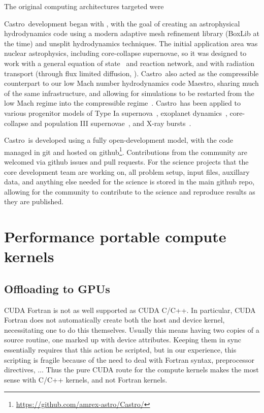 \documentclass[twocolumn,times]{aastex62}
\newcommand{\castro}{{\sf Castro}}
\newcommand{\maestro}{{\sf Maestro}}
\begin{document}
The original computing architectures targeted were

\castro\ development began with \cite{castro}, with the goal of
creating an astrophysical hydrodynamics code using a modern adaptive
mesh refinement library (BoxLib at the time) and unsplit hydrodynamics
techniques.  The initial application area was nuclear astrophysics,
including core-collapse supernovae, so it was designed to work with a
general equation of state~\cite{zingalekatz} and reaction network, and
with radiation transport (through flux limited diffusion,
\citealt{castro2,castro3}).  \castro\ also acted as the compressible
counterpart to our low Mach number hydrodynamics code \maestro,
sharing much of the same infrastructure, and allowing for simulations
to be restarted from the low Mach regime into the compressible
regime~\cite{malone:2014}.  \castro\ has been applied to various
progenitor models of Type Ia
supernova~\cite{malone:2014,katz:2016,polin:2019}, exoplanet
dynamics~\cite{ryu:2018}, core-collapse and population III
supernovae~\cite{chen:2014,dolence:2015,chen:2017}, and X-ray bursts~\cite{astronum:2018}.



\castro\ is developed using a fully open-development model, with the
code managed in git and hosted on
github\footnote{\url{https://github.com/amrex-astro/Castro/}}.
Contributions from the community are welcomed via github issues and
pull requests.  For the science projects that the core development
team are working on, all problem setup, input files, auxillary data,
and anything else needed for the science is stored in the main github
repo, allowing for the community to contribute to the science and
reproduce results as they are published.

\section{Performance portable compute kernels}


\subsection{Offloading to GPUs}

CUDA Fortran is not as well supported as CUDA C/C++.  In particular,
CUDA Fortran does not automatically create both the host and device
kernel, necessitating one to do this themselves.  Usually this means
having two copies of a source routine, one marked up with device
attributes.  Keeping them in sync essentially requires that this
action be scripted, but in our experience, this scripting is fragile
because of the need to deal with Fortran syntax, preprocessor
directives, ...  Thus the pure CUDA route for the compute kernels makes the most sense
with C/C++ kernels, and not Fortran kernels.
\end{document}
